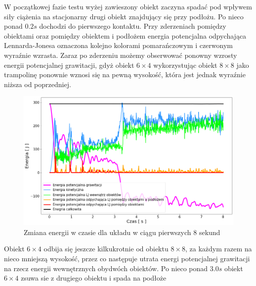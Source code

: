 \documentclass[12pt, letterpaper]{report}
\begin{document}
    W początkowej fazie testu wyżej zawieszony obiekt zaczyna spadać
    pod wpływem siły ciążenia na stacjonarny drugi obiekt znajdujący
    się przy podłożu. Po nieco ponad $0.2s$ dochodzi do pierwszego kontaktu.
    Przy zderzeniach pomiędzy obiektami oraz pomiędzy obiektem i podłożem energia potencjalna
    odpychająca Lennarda-Jonesa oznaczona kolejno kolorami pomarańczowym i czerwonym
    wyraźnie wzrasta. Zaraz po zderzeniu możemy obserwować ponowny wzrosty energii potencjalnej grawitacji,
    gdyż obiekt $6 \times 4$ wykorzystując obiekt $8 \times 8$ jako trampolinę ponownie wznosi się na 
    pewną wysokość, która jest jednak wyraźnie niższa od poprzedniej.

    \begin{figure}[H]
        \centering
        \includegraphics[width=14cm]{energy_test_0to8s}
        \caption{Zmiana energii w czasie dla układu w ciągu pierwszych 8 sekund}
    \end{figure}
    
    Obiekt $6 \times 4$ odbija się jeszcze kilkukrotnie od obiektu $8 \times 8$, za każdym 
    razem na nieco mniejszą wysokość, przez co następuje utrata energi potencjalnej grawitacji 
    na rzecz energii wewnętrznych obydwóch obiektów. Po nieco ponad $3.0s$ obiekt 
    $6 \times 4$ zsuwa sie z drugiego obiektu i spada na podłoże
\end{document}
